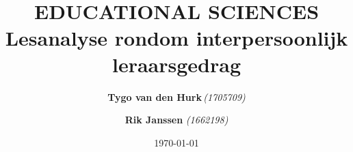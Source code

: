 \documentclass{article}
\title{ 
    \normalsize 
    \textsc{} \\
    [2.0cm]
    \HRule{1.5pt} \\
    \LARGE \textbf{
        \uppercase{
            Educational sciences}
    \HRule{2.0pt} \\ 
    [0.6cm] 
    \LARGE{
        Lesanalyse rondom interpersoonlijk leraarsgedrag} 
    \vspace*{
        10\baselineskip}}
}
\date{\today}
\author{
    \textbf{Tygo van den Hurk}\,\orcidlink{0009-0003-4182-5076}\textit{(1705709)} \and
    \textbf{Rik Janssen} \textit{(1662198)}
}
\begin{document}
    
    
    \maketitle
    \thispagestyle{empty}
    \newpage
    
    
    \renewcommand{\contentsname}{Inhoudsopgave}
    \tableofcontents
    \thispagestyle{empty}
    \newpage

\end{document}
